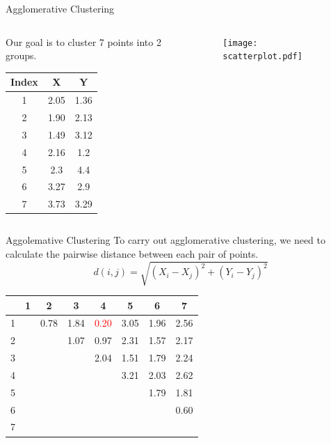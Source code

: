 \documentclass{beamer}
\begin{document}
	\begin{frame}{Agglomerative Clustering}
		\begin{columns}
			\begin{column}{0.4\linewidth}
				Our goal is to cluster 7 points into 2 groups.
				\begin{table}[htbp]
					\centering
					\begin{tabular}{ccc}
						\toprule
						Index & X & Y\\
						\midrule
						1 & 2.05 & 1.36\\
						2 & 1.90 & 2.13\\
						3 & 1.49 & 3.12\\
						4 & 2.16 & 1.2\\
						5 & 2.3 & 4.4\\
						6 & 3.27 & 2.9\\
						7 & 3.73 & 3.29\\
						\bottomrule
					\end{tabular}
				\end{table}
			\end{column}
			\begin{column}{0.6\linewidth}
				\begin{figure}[htbp]
					\centering
					\texttt{[image: scatterplot.pdf]}
				\end{figure}
			\end{column}
		\end{columns}
	\end{frame}
	
	\begin{frame}{Aggolemative Clustering}
		To carry out agglomerative clustering, we need to calculate the pairwise distance between each pair of points.
		\[ d(i, j) = \sqrt{(X_i - X_j)^2 + (Y_i - Y_j)^2 }\]
		
		\begin{table}
			\centering
			\begin{tabular}{c|ccccccc}
				&1&2&3&4&5&6&7\\
				\hline
				1&&0.78&1.84&\textcolor{red}{0.20}&3.05&1.96&2.56\\
				2&&&1.07&0.97&2.31&1.57&2.17\\
				3&&&&2.04&1.51&1.79&2.24\\
				4&&&&&3.21&2.03&2.62\\
				5&&&&&&1.79&1.81\\
				6&&&&&&&0.60\\
				7&&&&&&&\\
			\end{tabular}
		\end{table}
	\end{frame}
	
\end{document}
